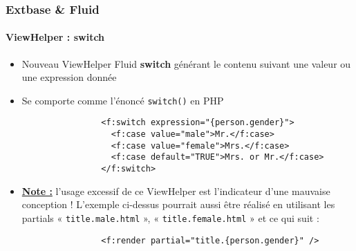 \begin{frame}[fragile]
	\frametitle{Extbase \& Fluid}
	\framesubtitle{ViewHelper : switch}

	\lstset{
		basicstyle=\smaller\ttfamily
	}

	\begin{itemize}
		\item Nouveau ViewHelper Fluid \textbf{switch} générant le contenu suivant une valeur ou une expression donnée
		\item Se comporte comme l'énoncé \texttt{switch()} en PHP

			\begin{lstlisting}
				<f:switch expression="{person.gender}">
				  <f:case value="male">Mr.</f:case>
				  <f:case value="female">Mrs.</f:case>
				  <f:case default="TRUE">Mrs. or Mr.</f:case>
				</f:switch>
			\end{lstlisting}

		\item \textbf{\underline{Note :}} l'usage excessif de ce ViewHelper est l'indicateur d'une mauvaise conception ! L'exemple ci-dessus pourrait aussi être réalisé en utilisant les partials « \texttt{title.male.html} », « \texttt{title.female.html} » et ce qui suit :

			\begin{lstlisting}
				<f:render partial="title.{person.gender}" />
			\end{lstlisting}

	\end{itemize}

\end{frame}


